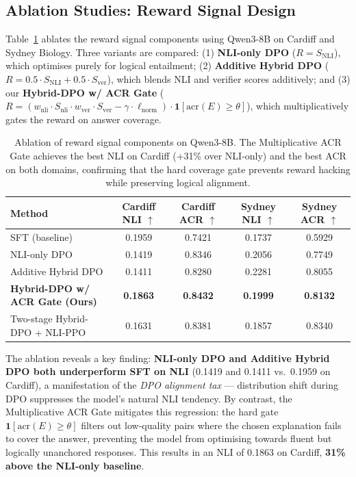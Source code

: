 \subsection{Ablation Studies: Reward Signal Design}
\label{sec:ablation}

Table~\ref{tab:ablation} ablates the reward signal components using Qwen3-8B on Cardiff and Sydney Biology. Three variants are compared: (1) \textbf{NLI-only DPO} ($R = S_{\text{NLI}}$), which optimises purely for logical entailment; (2) \textbf{Additive Hybrid DPO} ($R = 0.5 \cdot S_{\text{NLI}} + 0.5 \cdot S_{\text{ver}}$), which blends NLI and verifier scores additively; and (3) our \textbf{Hybrid-DPO w/ ACR Gate} ($R = (w_{\text{nli}} \cdot S_{\text{nli}} \cdot w_{\text{ver}} \cdot S_{\text{ver}} - \gamma \cdot \ell_{\text{norm}}) \cdot \mathbf{1}[\text{acr}(E) \geq \theta]$), which multiplicatively gates the reward on answer coverage.

\begin{table}[h]
\centering
\small
\begin{tabular}{l|c|c|c|c}
\toprule
Method & Cardiff NLI $\uparrow$ & Cardiff ACR $\uparrow$ & Sydney NLI $\uparrow$ & Sydney ACR $\uparrow$ \\
\midrule
SFT (baseline) & 0.1959 & 0.7421 & 0.1737 & 0.5929 \\
\midrule
NLI-only DPO & 0.1419 & 0.8346 & 0.2056 & 0.7749 \\
Additive Hybrid DPO & 0.1411 & 0.8280 & 0.2281 & 0.8055 \\
\textbf{Hybrid-DPO w/ ACR Gate (Ours)} & \textbf{0.1863} & \textbf{0.8432} & \textbf{0.1999} & \textbf{0.8132} \\
Two-stage Hybrid-DPO + NLI-PPO & 0.1631 & 0.8381 & 0.1857 & 0.8340 \\
\bottomrule
\end{tabular}
\caption{Ablation of reward signal components on Qwen3-8B. The Multiplicative ACR Gate achieves the best NLI on Cardiff (+31\% over NLI-only) and the best ACR on both domains, confirming that the hard coverage gate prevents reward hacking while preserving logical alignment.}
\label{tab:ablation}
\end{table}

The ablation reveals a key finding: \textbf{NLI-only DPO and Additive Hybrid DPO both underperform SFT on NLI} (0.1419 and 0.1411 vs.\ 0.1959 on Cardiff), a manifestation of the \emph{DPO alignment tax} --- distribution shift during DPO suppresses the model's natural NLI tendency. By contrast, the Multiplicative ACR Gate mitigates this regression: the hard gate $\mathbf{1}[\text{acr}(E) \geq \theta]$ filters out low-quality pairs where the chosen explanation fails to cover the answer, preventing the model from optimising towards fluent but logically unanchored responses. This results in an NLI of 0.1863 on Cardiff, \textbf{31\% above the NLI-only baseline}.

